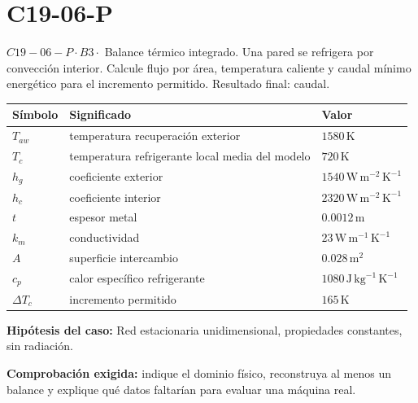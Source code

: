 \documentclass[10pt,openany]{book}
\begin{document}
\section{C19-06-P}
\(C19-06-P \cdot B3 \cdot\) Balance térmico integrado. Una pared se refrigera por convección interior. Calcule flujo por área, temperatura caliente y caudal mínimo energético para el incremento permitido. Resultado final: caudal.
\begin{center}\begin{tabular}{p{.15\linewidth}p{.42\linewidth}p{.31\linewidth}}\textbf{Símbolo} & \textbf{Significado} & \textbf{Valor}\\\hline
\(T_{aw}\) & temperatura recuperación exterior & \(1580\,\mathrm{K}\)\\
\(T_c\) & temperatura refrigerante local media del modelo & \(720\,\mathrm{K}\)\\
\(h_g\) & coeficiente exterior & \(1540\,\mathrm{W}\,\mathrm{m}^{-2}\,\mathrm{K}^{-1}\)\\
\(h_c\) & coeficiente interior & \(2320\,\mathrm{W}\,\mathrm{m}^{-2}\,\mathrm{K}^{-1}\)\\
\(t\) & espesor metal & \(0.0012\,\mathrm{m}\)\\
\(k_m\) & conductividad & \(23\,\mathrm{W}\,\mathrm{m}^{-1}\,\mathrm{K}^{-1}\)\\
\(A\) & superficie intercambio & \(0.028\,\mathrm{m}^{2}\)\\
\(c_p\) & calor específico refrigerante & \(1080\,\mathrm{J}\,\mathrm{kg}^{-1}\,\mathrm{K}^{-1}\)\\
\(\Delta T_c\) & incremento permitido & \(165\,\mathrm{K}\)\\
\end{tabular}\end{center}
\noindent\textbf{Hipótesis del caso:} Red estacionaria unidimensional, propiedades constantes, sin radiación.\par
\noindent\textbf{Comprobación exigida:} indique el dominio físico, reconstruya al menos un balance y explique qué datos faltarían para evaluar una máquina real.\par
\begin{center}\end{center}
\end{document}
